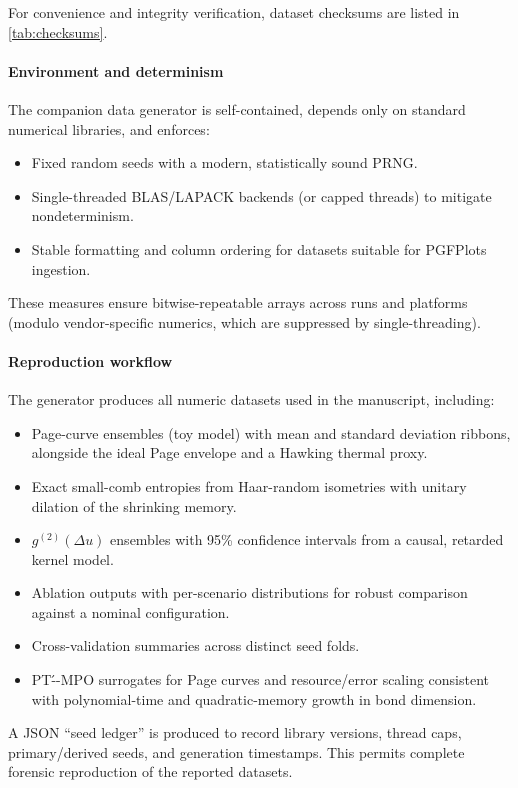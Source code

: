 \documentclass[a4paper,11pt]{article}
\theoremstyle{plain}
\theoremstyle{definition}
\theoremstyle{remark}
\begin{document}
For convenience and integrity verification, dataset checksums are listed in \cref{tab:checksums}.

\paragraph{Environment and determinism}
The companion data generator is self-contained, depends only on standard numerical libraries, and enforces:
\begin{itemize}
  \item Fixed random seeds with a modern, statistically sound PRNG.
  \item Single-threaded BLAS/LAPACK backends (or capped threads) to mitigate nondeterminism.
  \item Stable formatting and column ordering for datasets suitable for PGFPlots ingestion.
\end{itemize}
These measures ensure bitwise-repeatable arrays across runs and platforms (modulo vendor-specific numerics, which are suppressed by single-threading).

\paragraph{Reproduction workflow}
The generator produces all numeric datasets used in the manuscript, including:
\begin{itemize}
  \item Page-curve ensembles (toy model) with mean and standard deviation ribbons, alongside the ideal Page envelope and a Hawking thermal proxy.
  \item Exact small-comb entropies from Haar-random isometries with unitary dilation of the shrinking memory.
  \item $g^{(2)}(\Delta u)$ ensembles with 95\% confidence intervals from a causal, retarded kernel model.
  \item Ablation outputs with per-scenario distributions for robust comparison against a nominal configuration.
  \item Cross-validation summaries across distinct seed folds.
  \item PT\'--MPO surrogates for Page curves and resource/error scaling consistent with polynomial-time and quadratic-memory growth in bond dimension.
\end{itemize}
A JSON ``seed ledger'' is produced to record library versions, thread caps, primary/derived seeds, and generation timestamps. This permits complete forensic reproduction of the reported datasets.
\end{document}

